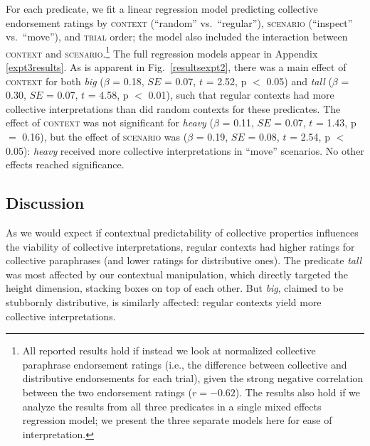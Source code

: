\documentclass[linguex]{sp}
\begin{document}
For each predicate, we fit a linear regression model predicting collective endorsement ratings by \textsc{context} (``random'' vs.~``regular''),
 \textsc{scenario} (``inspect'' vs.~``move''), and \textsc{trial} order; the model also included the interaction between \textsc{context} and \textsc{scenario}.\footnote{All reported results hold if instead we look at normalized collective paraphrase endorsement ratings (i.e., the difference between collective and distributive endorsements for each trial), given the strong negative correlation between the two endorsement ratings ($r=-0.62$). The results also hold if we analyze the results from all three predicates in a single mixed effects regression model; we present the three separate models here for ease of interpretation.} The full regression models appear in Appendix \ref{expt3results}.
As is apparent in Fig.~\ref{resultsexpt2}, there was a main effect of \textsc{context} for both \emph{big} ($\beta$ = 0.18, $SE$ = 0.07, $t$ = 2.52, p $<$ 0.05) and \emph{tall} ($\beta$ = 0.30, $SE$ = 0.07, $t$ = 4.58, p $<$ 0.01), such that regular contexts had more collective interpretations than did random contexts for these predicates. The effect of \textsc{context} was not significant for \emph{heavy} ($\beta$ = 0.11, $SE$ = 0.07, $t$ = 1.43, p $=$ 0.16), but the effect of \textsc{scenario} was ($\beta$ = 0.19, $SE$ = 0.08, $t$ = 2.54, p $<$ 0.05): \emph{heavy} received more collective interpretations in ``move'' scenarios. No other effects reached significance.


\subsection{Discussion}

As we would expect if contextual predictability of collective properties influences the viability of collective interpretations, regular contexts had higher ratings for collective paraphrases (and lower ratings for distributive ones). The predicate \textit{tall} was most affected by our contextual manipulation, which directly targeted the height dimension, stacking boxes on top of each other. But \emph{big}, claimed to be stubbornly distributive, is similarly affected: regular contexts yield more collective interpretations. 
\end{document}
